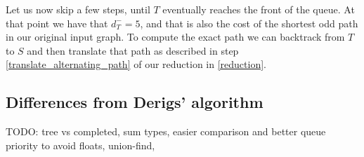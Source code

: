 

Let us now skip a few steps, until $T$ eventually reaches the front of the queue. At that point we have that $d^-_T = 5$, and that is also the cost of the shortest odd path in our original input graph. To compute the exact path we can backtrack from $T$ to $S$ and then translate that path as described in step \ref{translate_alternating_path} of our reduction in \ref{reduction}.

\subsection{Differences from Derigs' algorithm}
TODO: tree vs completed, sum types, easier comparison and better queue priority to avoid floats, union-find, 

